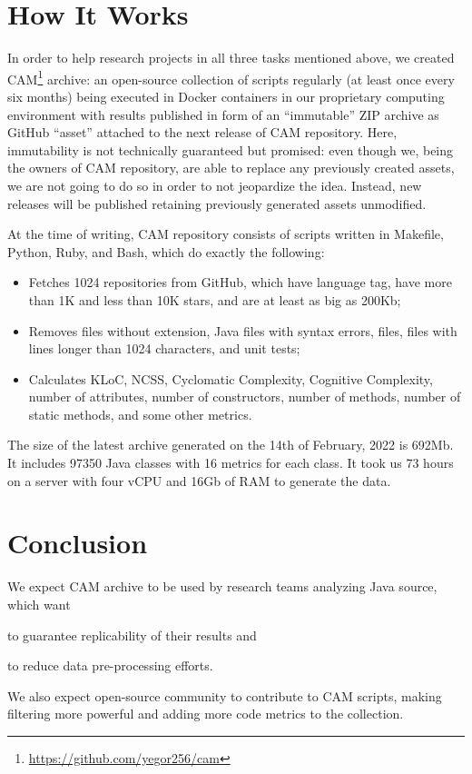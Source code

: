 \documentclass[10pt,sigplan,nonacm,natbib=false]{acmart}
\begin{document}
\section*{How It Works}

In order to help research projects in all three tasks mentioned above, we created CAM\footnote{\url{https://github.com/yegor256/cam}} archive: an open-source collection of scripts regularly (at least once every six months) being executed in Docker containers in our proprietary computing environment with results published in form of an ``immutable'' ZIP archive as GitHub ``asset'' attached to the next release of CAM repository. Here, immutability is not technically guaranteed but promised: even though we, being the owners of CAM repository, are able to replace any previously created assets, we are not going to do so in order to not jeopardize the idea. Instead, new releases will be published retaining previously generated assets unmodified.

At the time of writing, CAM repository consists of scripts written in Makefile, Python, Ruby, and Bash, which do exactly the following:

\begin{itemize}
    \item Fetches 1024 repositories from GitHub, which have  language tag, have more than 1K and less than 10K stars, and are at least as big as 200Kb;
    \item Removes files without  extension, Java files with syntax errors,  files, files with lines longer than 1024 characters, and unit tests;
    \item Calculates KLoC, NCSS, Cyclomatic Complexity, Cognitive Complexity, number of attributes, number of constructors, number of methods, number of static methods, and some other metrics.
\end{itemize}

The size of the latest archive generated on the 14th of February, 2022 is 692Mb. It includes 97350 Java classes with 16 metrics for each class. It took us 73 hours on a server with four vCPU and 16Gb of RAM to generate the data.

\section*{Conclusion}

We expect CAM archive to be used by research teams analyzing Java source, which want
\begin{inparaenum}[(a)]
\item to guarantee replicability of their results
and
\item to reduce data pre-processing efforts.
\end{inparaenum}
We also expect open-source community to contribute to CAM scripts, making filtering more powerful and adding more code metrics to the collection.

\printbibliography
\end{document}
